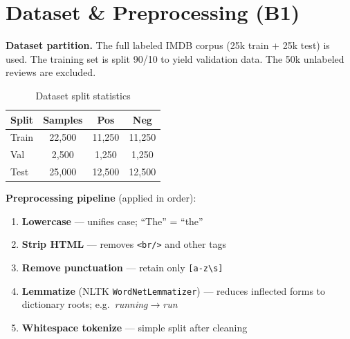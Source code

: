 \documentclass[10pt,a4paper,twocolumn]{article}
\begin{document}

\setcounter{section}{0}
\section{Dataset \& Preprocessing (B1)}

\textbf{Dataset partition.}
The full labeled IMDB corpus (25k train + 25k test) is used. The training set
is split 90/10 to yield validation data. The 50k unlabeled reviews are excluded.

\begin{table}[H]
\centering\small
\caption{Dataset split statistics}
\begin{tabular}{lccc}
\toprule
Split & Samples & Pos & Neg\\
\midrule
Train & 22,500 & 11,250 & 11,250\\
Val   &  2,500 &  1,250 &  1,250\\
Test  & 25,000 & 12,500 & 12,500\\
\bottomrule
\end{tabular}
\label{tab:dataset}
\end{table}

\textbf{Preprocessing pipeline} (applied in order):
\begin{enumerate}
  \item \textbf{Lowercase} — unifies case; ``The'' = ``the''
  \item \textbf{Strip HTML} — removes \texttt{<br/>} and other tags
  \item \textbf{Remove punctuation} — retain only \texttt{[a-z\textbackslash s]}
  \item \textbf{Lemmatize} (NLTK \texttt{WordNetLemmatizer}) — reduces inflected
        forms to dictionary roots; e.g.\ \textit{running}$\to$\textit{run}
  \item \textbf{Whitespace tokenize} — simple split after cleaning
\end{enumerate}
\end{document}
